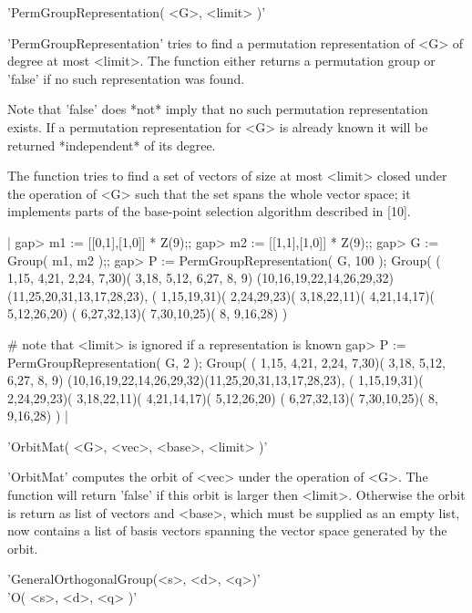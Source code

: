  

%

'PermGroupRepresentation( <G>, <limit> )'

'PermGroupRepresentation' tries to find  a permutation representation  of
<G> of degree at most <limit>.  The function either returns a permutation
group or 'false' if no such representation was found.

Note that   'false'   does    *not* imply  that    no  such   permutation
representation  exists.    If a permutation   representation   for <G> is
already known it will be returned *independent* of its degree.

The function   tries to find  a set  of vectors  of size at  most <limit>
closed under  the operation  of <G>  such that  the set spans   the whole
vector space;  it implements parts  of the base-point selection algorithm
described in [10].

|    gap> m1 := [[0,1],[1,0]] * Z(9);;
    gap> m2 := [[1,1],[1,0]] * Z(9);;
    gap> G := Group( m1, m2 );;
    gap> P := PermGroupRepresentation( G, 100 );
    Group( ( 1,15, 4,21, 2,24, 7,30)( 3,18, 5,12, 6,27, 8, 9)
     (10,16,19,22,14,26,29,32)(11,25,20,31,13,17,28,23),
     ( 1,15,19,31)( 2,24,29,23)( 3,18,22,11)( 4,21,14,17)( 5,12,26,20)
     ( 6,27,32,13)( 7,30,10,25)( 8, 9,16,28) )

    # note that <limit> is ignored if a representation is known
    gap> P := PermGroupRepresentation( G, 2 );  
    Group( ( 1,15, 4,21, 2,24, 7,30)( 3,18, 5,12, 6,27, 8, 9)
     (10,16,19,22,14,26,29,32)(11,25,20,31,13,17,28,23),
     ( 1,15,19,31)( 2,24,29,23)( 3,18,22,11)( 4,21,14,17)( 5,12,26,20)
     ( 6,27,32,13)( 7,30,10,25)( 8, 9,16,28) ) |

'OrbitMat( <G>, <vec>, <base>, <limit> )'

'OrbitMat' computes  the orbit of <vec> under  the operation of <G>.  The
function  will  return 'false'  if  this orbit  is  larger then  <limit>.
Otherwise the orbit is  return as list  of vectors and <base>, which must
be supplied as an empty list, now contains  a list of  basis vectors 
spanning the  vector space generated by the orbit.


'GeneralOrthogonalGroup(<s>, <d>, <q>)' \\
'O( <s>, <d>, <q> )'

